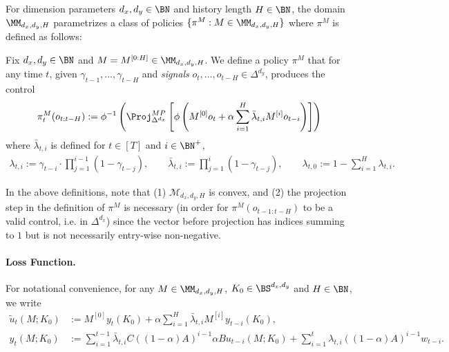 For dimension parameters $d_x,d_y \in \BN$ and history length $H \in \BN$, the domain $\MM_{d_x,d_y,H}$ parametrizes a class of policies $\{\pi^M: M \in \MM_{d_x,d_y,H}\}$ where $\pi^M$ is defined as follows:

\begin{definition} 
\label{def:learning-policy}
Fix $d_x,d_y \in \BN$ and $M = M^{[0:H]} \in \MM_{d_x,d_y,H}$. We define a policy $\pi^M$ that for any time $t$, given $\gamma_{t-1},\dots,\gamma_{t-H}$ and \emph{signals} $o_t,\dots,o_{t-H} \in \Delta^{d_y}$, produces the control
\begin{align*}
\pi^M_t(o_{t:t-H}) := \phi^{-1}\left(\Proj_{\Delta^{d_x}}^{MP}\left[\phi\left(M^{[0]}o_t+\alpha\sum_{i=1}^{H}\bar{\lambda}_{t,i}M^{[i]}o_{t-i}\right)\right]\right)
\end{align*}
where $\bar\lambda_{t,i}$ is defined for $t \in [T]$ and $i \in \BN^+$, 
\begin{align}
\lambda_{t,i} := \gamma_{t-i} \cdot \prod_{j=1}^{i-1} (1-\gamma_{t-j}), \qquad \bar \lambda_{t,i} := \prod_{j=1}^{i} (1-\gamma_{t-j})\label{eq:define-lambdas}, \qquad \lambda_{t,0} := 1 - \sum_{i=1}^H \lambda_{t,i}.
\end{align}
\end{definition}

\iffalse
where $u_t(M; K_0)$ is the control at time $t$ according to $M$ with signals $y_{t-H:t}(K_0)$, given by
\begin{align*}
u_t(M;K_0)=u_t(M^{[0:H]};K_0)=\Pi_{\Delta^{d_x}}^{\|\cdot\|_2}\left[M^{[0]}y_t(K_0)+\sum_{i=1}^{H}\bar{\lambda}_{t,i}M^{[i]}y_{t-i}(K_0)\right],
\end{align*}

\fi

In the above definitions, note that (1) $\mathcal{M}_{d_x,d_y,H}$ is convex, and (2) the projection step in the definition of $\pi^M$ is necessary (in order for $\pi^M(o_{t-1:t-H})$ to be a valid control, i.e. in $\Delta^{d_x}$) since the vector before projection has indices summing to $1$ but is not necessarily entry-wise non-negative.

\paragraph{Loss Function.}
For notational convenience, for any $M \in \MM_{d_x,d_y,H}$, $K_0 \in \BS^{d_x,d_y}$ and $H \in \BN$, we write
\begin{align*}
\tilde{u}_t(M;K_0) &:= M^{[0]}y_t(K_0) + \alpha \sum_{i=1}^H \bar\lambda_{t,i} M^{[i]} y_{t-i}(K_0), \\ 
y_t(M;K_0) &:= \sum_{i=1}^{t-1}\bar\lambda_{t,i} C((1-\alpha)A)^{i-1}\alpha B u_{t-i}(M;K_0) + \sum_{i=1}^t \lambda_{t,i} ((1-\alpha)A)^{i-1} w_{t-i}.
\end{align*}

